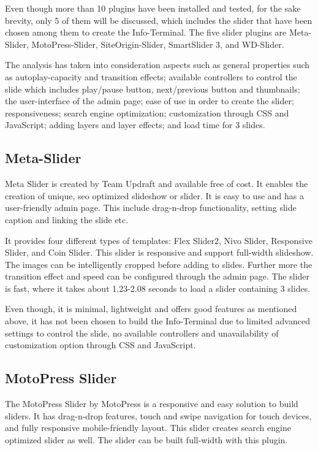 Even though more than 10 plugins have been installed and tested, for the sake brevity, only 5 of them will be discussed, which includes the slider that have been chosen among them to create the Info-Terminal. The five slider plugins are Meta-Slider, MotoPress-Slider, SiteOrigin-Slider, SmartSlider 3, and WD-Slider.

The analysis has taken into consideration aspects such as general properties such as autoplay-capacity and transition effects; available controllers to control the slide which includes play/pause button, next/previous button and thumbnails; the user-interface of the admin page; ease of use in order to create the slider; responsiveness; search engine optimization; customization through CSS and JavaScript; adding layers and layer effects; and load time for 3 slides.

\subsection{Meta-Slider}
Meta Slider \cite{TeamUpdraft.2016}\cite{TeamUpdraft.2016b} is created by Team Updraft and available free of cost. It enables the creation of unique, \ac{seo} optimized slideshow or slider. It is easy to use and has a user-friendly admin page. This include drag-n-drop functionality, setting slide caption and linking the slide etc.

It provides four different types of templates: Flex Slider2, Nivo Slider, Responsive Slider, and Coin Slider. This slider is responsive and support full-width slideshow. The images can be intelligently cropped before adding to slides. Further more the transition effect and speed can be configured through the admin page. The slider is fast, where it takes about 1.23-2.08 seconds to load a slider containing 3 slides.

Even though, it is minimal, lightweight and offers good features as mentioned above, it has not been chosen to build the Info-Terminal due to limited advanced settings to control the slide, no available controllers and unavailability of customization option through CSS and JavaScript.

\subsection{MotoPress Slider}
The MotoPress Slider \cite{MotoPress.2015}\cite{MotoPress.2016} by MotoPress is a responsive and easy solution to build sliders. It has drag-n-drop features, touch and swipe navigation for touch devices, and fully responsive mobile-friendly layout. This slider creates search engine optimized slider as well. The slider can be built full-width with this plugin.

